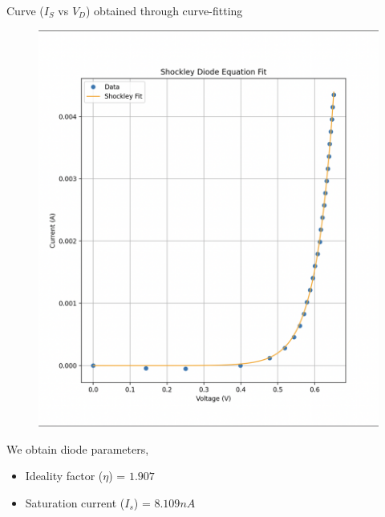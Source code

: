 \documentclass[12pt,a4paper]{article}
\begin{document}
\pagebreak
\newline Curve ($I_S$ vs $V_D$) obtained through curve-fitting
\begin{figure}[h!]
    \centering
    \includegraphics[width=0.7\linewidth]{figs/curve_fit.png}
\end{figure}
\newline We obtain diode parameters,
\begin{itemize}
    \item Ideality factor ($\eta$) = $1.907$
    \item Saturation current ($I_s$) = $8.109nA$
\end{itemize}
\pagebreak
\end{document}
